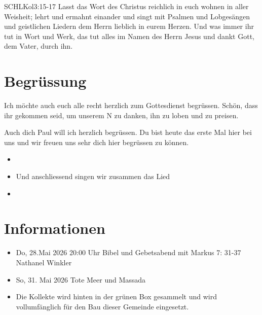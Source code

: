 \documentclass[fontsize=14pt]{../../inc/mybib}
\newcommand{\Name}{Paul}
\begin{document}
\begin{bibelbox}{SCHL}{Kol}{3:15-17}
    Lasst das Wort des Christus reichlich in euch wohnen in aller Weisheit; lehrt und ermahnt einander und singt mit Psalmen und Lobgesängen und geistlichen Liedern dem Herrn lieblich in eurem Herzen. Und was immer ihr tut in Wort und Werk, das tut alles im Namen des Herrn Jesus und dankt Gott, dem Vater, durch ihn.
\end{bibelbox}
\section{Begrüssung}
Ich möchte auch euch alle recht herzlich zum Gottesdienst begrüssen. Schön, dass ihr gekommen seid, um unserem \herr N zu danken, ihn zu loben und zu preisen.

Auch dich \Name{} will ich herzlich begrüssen. Du bist heute das erste Mal hier bei uns und wir freuen uns sehr dich hier begrüssen zu können.
\begin{itemize}
    \item[] 
    \item[] Und anschliessend singen wir zusammen das Lied
    \item[] 
\end{itemize}

\section{Informationen}
\begin{itemize}
    \item {} Do, 28.Mai 2026 20:00 Uhr Bibel und Gebetsabend mit Markus 7: 31-37 Nathanel Winkler
    \item {} So, 31. Mai 2026 Tote Meer und Massada
    \item {} Die Kollekte wird hinten in der grünen Box gesammelt und wird vollumfänglich für den Bau dieser Gemeinde eingesetzt.
\end{itemize}
\end{document}
